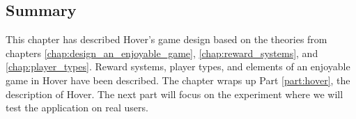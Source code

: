 \subsection{Summary}
This chapter has described Hover’s game design based on the theories from chapters \ref{chap:design_an_enjoyable_game}, \ref{chap:reward_systems}, and \ref{chap:player_types}. Reward systems, player types, and elements of an enjoyable game in Hover have been described. The chapter wraps up Part \ref{part:hover}, the description of Hover. The next part will focus on the experiment where we will test the application on real users.